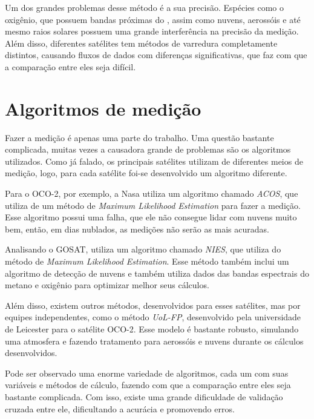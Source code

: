 \documentclass[12pt,a4paper]{article}
\begin{document}
Um dos grandes problemas desse método é a sua precisão. Espécies como o oxigênio, que possuem bandas próximas do , assim como nuvens, aerossóis e até mesmo raios solares possuem uma grande interferência na precisão da medição.
Além disso, diferentes satélites tem métodos de varredura completamente distintos, causando fluxos de dados com diferenças significativas, que faz com que a comparação entre eles seja difícil. \par

\section{Algoritmos de medição}

Fazer a medição é apenas uma parte do trabalho. Uma questão bastante complicada, muitas vezes a causadora grande de problemas são os algoritmos utilizados.
Como já falado, os principais satélites utilizam de diferentes meios de medição, logo, para cada satélite foi-se desenvolvido um algoritmo diferente. \par

Para o OCO-2, por exemplo, a Nasa utiliza um algoritmo chamado \textit{ACOS}, que utiliza de um método de \textit{Maximum Likelihood Estimation} para fazer a medição. Esse algoritmo possui uma falha, que ele não consegue lidar com nuvens muito bem, então, em dias nublados, as medições não serão as mais acuradas. \par

Analisando o GOSAT, utiliza um algoritmo chamado \textit{NIES}, que utiliza do método de \textit{Maximum Likelihood Estimation}. Esse método também inclui um algoritmo de detecção de nuvens e também utiliza dados das bandas espectrais do metano e oxigênio para optimizar melhor seus cálculos. \par

Além disso, existem outros métodos, desenvolvidos para esses satélites, mas por equipes independentes, como o método \textit{UoL-FP}, desenvolvido pela universidade de Leicester para o satélite OCO-2. Esse modelo é bastante robusto, simulando uma atmosfera e fazendo tratamento para aerossóis e nuvens durante os cálculos desenvolvidos. \par

Pode ser observado uma enorme variedade de algoritmos, cada um com suas variáveis e métodos de cálculo, fazendo com que a comparação entre eles seja bastante complicada. Com isso, existe uma grande dificuldade de validação cruzada entre ele, dificultando a acurácia e promovendo erros. \par
\end{document}
